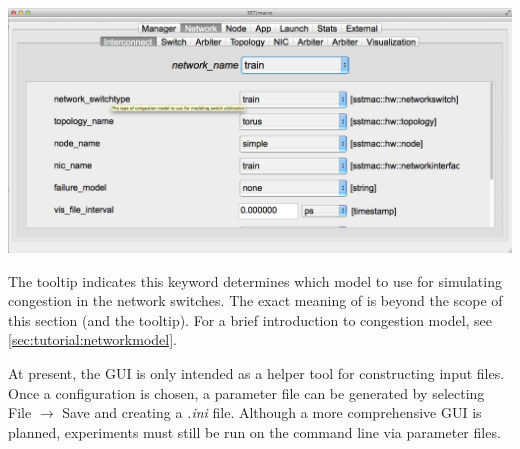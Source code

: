 \begin{center}
\includegraphics[width=1.0\textwidth]{figures/gui/networkswitchtooltip.png}
\end{center}
The tooltip indicates this keyword determines which model to use for simulating congestion in the network switches. 
The exact meaning of  is beyond the scope of this section (and the tooltip). 
For a brief introduction to congestion model, see \ref{sec:tutorial:networkmodel}.

At present, the GUI is only intended as a helper tool for constructing input files.  
Once a configuration is chosen, a parameter file can be generated by selecting File $\rightarrow$ Save and creating a \textit{.ini} file.  
Although a more comprehensive GUI is planned, experiments must still be run on the command line via parameter files.
